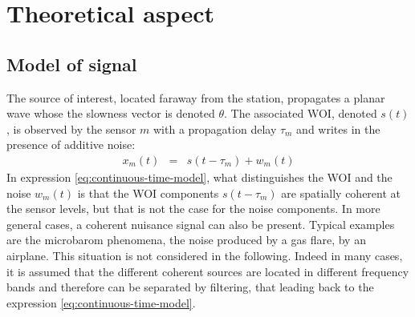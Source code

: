 \documentclass[graybox]{svmult/styles/svmult}
\begin{document}
  \section{Theoretical aspect}
  \subsection{Model of signal}
 The source of interest, located faraway from the station, propagates a planar wave whose the slowness vector is denoted $\theta$.  The associated WOI, denoted $s(t)$, is observed by the sensor $m$ with a propagation delay $\tau_{m}$ and writes in the presence of additive noise:
\begin{eqnarray}
 \label{eq:continuous-time-model}
 x_{m}(t)&=&s(t-\tau_{m})+w_{m}(t)
\end{eqnarray}
In expression \eqref{eq:continuous-time-model},  what distinguishes the WOI and the noise $w_{m}(t)$ is that the WOI components $s(t-\tau_{m})$ are spatially coherent at the sensor levels, but that is not the case for the noise components. In more general cases, a coherent nuisance signal can also be present. Typical examples are the microbarom phenomena,  the noise produced by a gas flare, by an airplane. This situation is  not considered in the following.  Indeed in many cases, it is assumed that the different coherent sources are located in different frequency bands and therefore can be separated by filtering, that leading back to  the expression \eqref{eq:continuous-time-model}. 
\end{document}
